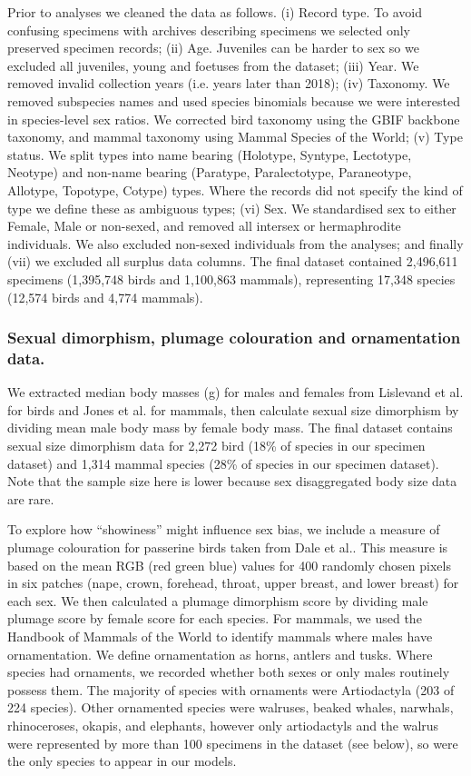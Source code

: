 \documentclass[a4paper, 12pt]{article}
\begin{document}
Prior to analyses we cleaned the data as follows. 
(i) Record type. To avoid confusing specimens with archives describing specimens we selected only preserved specimen records; 
(ii) Age. Juveniles can be harder to sex so we excluded all juveniles, young and foetuses from the dataset; 
(iii) Year. We removed invalid collection years (i.e. years later than 2018); 
(iv) Taxonomy. We removed subspecies names and used species binomials because we were  interested in species-level sex ratios. We corrected bird taxonomy using the GBIF backbone taxonomy\cite{gbif}, and mammal taxonomy using Mammal Species of the World\cite{wilson2005mammal}; 
(v) Type status. We split types into name bearing (Holotype, Syntype, Lectotype, Neotype) and non-name bearing (Paratype, Paralectotype, Paraneotype, Allotype, Topotype, Cotype) types. Where the records did not specify the kind of type we define these as ambiguous types; 
(vi) Sex. We standardised sex to either Female, Male or non-sexed, and removed all intersex or hermaphrodite individuals. 
We also excluded non-sexed individuals from the analyses; and finally 
(vii) we excluded all surplus data columns. 
The final dataset contained 2,496,611 specimens (1,395,748 birds and 1,100,863 mammals), representing 17,348 species (12,574 birds and 4,774 mammals). 

\subsubsection{Sexual dimorphism, plumage colouration and ornamentation data.}
We extracted median body masses (g) for males and females from Lislevand et al.\cite{lislevand2007avian} for birds and Jones et al.\cite{pantheria} for mammals, then calculate sexual size dimorphism by dividing mean male body mass by female body mass. 
The final dataset contains sexual size dimorphism data for 2,272 bird (18\% of species in our specimen dataset) and 1,314 mammal species (28\% of species in our specimen dataset). 
Note that the sample size here is lower because sex disaggregated body size data are rare.

To explore how ``showiness'' might influence sex bias, we include a measure of plumage colouration for passerine birds taken from Dale et al.\cite{dale2015data,dale2015effects}. 
This measure is based on the mean RGB (red green blue) values for 400 randomly chosen pixels in six patches (nape, crown, forehead, throat, upper breast, and lower breast) for each sex. 
We then calculated a plumage dimorphism score by dividing male plumage score by female score for each species. 
For mammals, we used the Handbook of Mammals of the World to identify mammals where males have ornamentation. We define ornamentation as horns, antlers and tusks. 
Where species had ornaments, we recorded whether both sexes or only males routinely possess them. The majority of species with ornaments were Artiodactyla (203 of 224 species). 
Other ornamented species were walruses, beaked whales, narwhals, rhinoceroses, okapis, and elephants, however only artiodactyls and the walrus were represented by more than 100 specimens in the dataset (see below), so were the only species to appear in our models.
\end{document}
